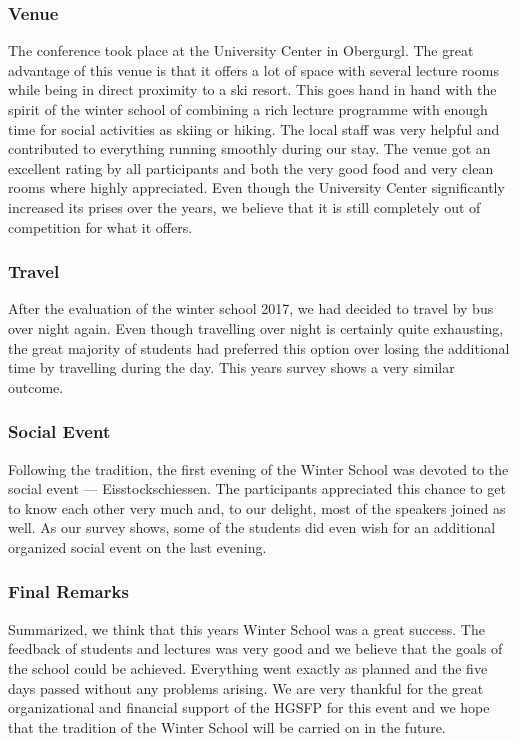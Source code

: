 \subsubsection*{Venue}
The conference took place at the University Center in Obergurgl. The
great advantage of this venue is that it offers a lot of space with
several lecture rooms while being in direct proximity to a ski resort.
This goes hand in hand with the spirit of the winter school of combining
a rich lecture programme with enough time for social activities as
skiing or hiking. The local staff was very helpful and contributed to
everything running smoothly during our stay. The venue got an excellent
rating by all participants and both the very good food and very clean
rooms where highly appreciated. Even though the University Center
significantly increased its prises over the years, we believe that it is
still completely out of competition for what it offers.


\subsubsection*{Travel}
After the evaluation of the winter school 2017, we had decided to travel
by bus over night again. Even though travelling over night is
certainly quite exhausting, the great majority of students had preferred
this option over losing the additional time by travelling during the
day. This years survey shows a very similar outcome.

\subsubsection*{Social Event}
Following the tradition, the first evening of the Winter School was
devoted to the social event — Eisstockschiessen. The participants
appreciated this chance to get to know each other very
much and, to our delight, most of the speakers joined as well. As our
survey shows, some of the students did even wish for an additional
organized social event on the last evening.

\subsubsection*{Final Remarks}
Summarized, we think that this years Winter School was a great success.
The feedback of students and lectures was very good and we believe that
the goals of the school could be achieved. Everything went exactly as
planned and the five days passed without any problems arising. We are
very thankful for the great organizational and financial support of the
HGSFP for this event and we hope that the tradition of the Winter School
will be carried on in the future.


